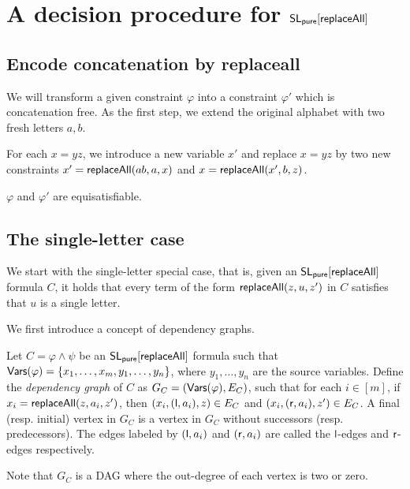 


\section{A decision procedure for $\mathsf{SL_{pure}}[\mathsf{replaceAll}]$} \label{sec:replaceallpure}

\subsection{Encode concatenation by replaceall}

We will transform a given constraint $\varphi$ into a constraint $\varphi'$ which is concatenation free. As the first step, we extend the original alphabet with two fresh letters $a,b$. 

For each $x=yz$, we introduce a new variable $x'$ and replace $x=yz$ by two new constraints 
$x'=\mathsf{replaceAll}(ab, a, x)$ and $x=\mathsf{replaceAll}(x', b, z)$. 

\begin{proposition}
	$\varphi$ and $\varphi'$ are equisatisfiable. 	
\end{proposition}

\subsection{The single-letter case}

We start with the single-letter special case, that is, given an $\mathsf{SL_{pure}}[\mathsf{replaceAll}]$ formula $C$, it holds that every term of the form $\mathsf{replaceAll}(z, u, z')$ in $C$ satisfies that $u$ is a single letter.

We first introduce a concept of dependency graphs.

\begin{definition}
	Let $C= \varphi \wedge \psi$ be an $\mathsf{SL_{pure}}[\mathsf{replaceAll}]$ formula such that $\mathsf{Vars}(\varphi) = \{x_1,\dots, x_m, y_1, \dots, y_n\}$, where $y_1,\dots, y_n$ are the source variables. Define the \emph{dependency graph} of $C$ as $G_C= (\mathsf{Vars}(\varphi), E_C)$, such that for each $i \in [m]$, if $x_i = \mathsf{replaceAll}(z, a_i, z')$, then $(x_i, (\mathsf{l}, a_i), z) \in E_C$ and $(x_i, (\mathsf{r}, a_i), z') \in E_C$. A final (resp. initial) vertex in $G_C$ is a vertex in $G_C$ without successors (resp. predecessors). The edges labeled by $(\mathsf{l},a_i)$ and $(\mathsf{r}, a_i)$ are called the $\mathsf{l}$-edges and $\mathsf{r}$-edges respectively. 
\end{definition}
Note that $G_C$ is a DAG where the out-degree of each vertex is two or zero. 


